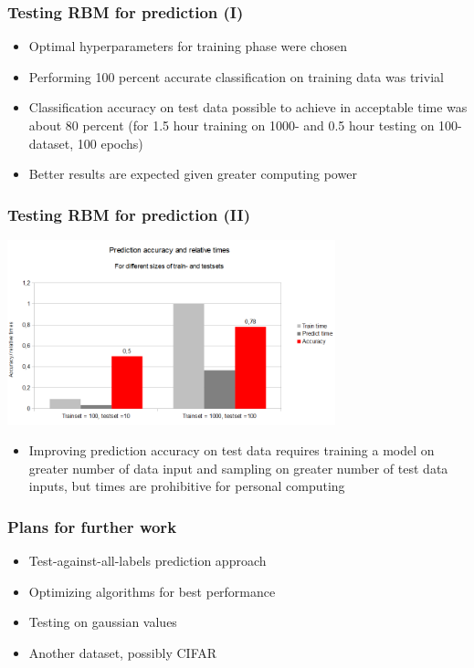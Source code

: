 \documentclass{beamer}
\begin{document}
  \begin{frame}
    \frametitle{Testing RBM for prediction (I)}
    \begin{itemize}
    \item Optimal hyperparameters for training phase were chosen
	\item Performing 100 percent accurate classification on training data was trivial 
	\item Classification accuracy on test data possible to achieve in acceptable time was about 80 percent (for 1.5 hour training on 1000- and 0.5 hour testing on 100-dataset, 100 epochs)
	\item Better results are expected given greater computing power
	\end{itemize}
  \end{frame}
  \begin{frame}
    \frametitle{Testing RBM for prediction (II)}
    \includegraphics[width=9.5cm]{images/acc.png}
    \begin{itemize}
	\item Improving prediction accuracy on test data requires training a model on greater number of data input and sampling on greater number of test data inputs, but times are prohibitive for personal computing
	\end{itemize}
  \end{frame}
  \begin{frame}
    \frametitle{Plans for further work}
    \begin{itemize}
    \item Test-against-all-labels prediction approach
    \item Optimizing algorithms for best performance
	\item Testing on gaussian values
	\item Another dataset, possibly CIFAR
	\end{itemize}
  \end{frame}
\end{document}
